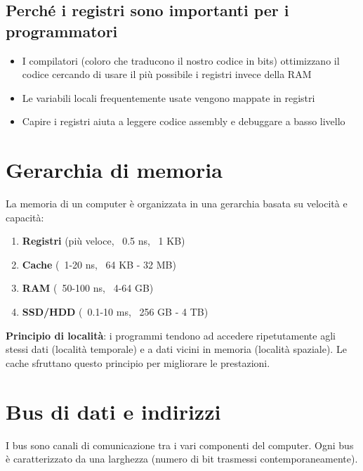 \documentclass[12pt,a4paper]{article}
\begin{document}
\subsection{\texorpdfstring{\colorbox{gray!50}{Perché i registri sono importanti per i programmatori}}{}}
\begin{itemize}
    \item I compilatori (coloro che traducono il nostro codice in bits) ottimizzano il codice cercando di usare il più possibile i registri invece della RAM
    \item Le variabili locali frequentemente usate vengono mappate in registri
    \item Capire i registri aiuta a leggere codice assembly e debuggare a basso livello
\end{itemize}

\section{Gerarchia di memoria}
La memoria di un computer è organizzata in una gerarchia basata su velocità e capacità:

\begin{enumerate}
    \item \textbf{Registri} (più veloce, ~0.5 ns, ~1 KB)
    \item \textbf{Cache} (~1-20 ns, ~64 KB - 32 MB)
    \item \textbf{RAM} (~50-100 ns, ~4-64 GB)
    \item \textbf{SSD/HDD} (~0.1-10 ms, ~256 GB - 4 TB)
\end{enumerate}

\textbf{\texorpdfstring{\colorbox{gray!50}{Principio di località}}{}}: i programmi tendono ad accedere ripetutamente agli stessi dati (località temporale) e a dati vicini in memoria (località spaziale). Le cache sfruttano questo principio per migliorare le prestazioni.

\section{Bus di dati e indirizzi}
I bus sono canali di comunicazione tra i vari componenti del computer. Ogni bus è caratterizzato da una larghezza (numero di bit trasmessi contemporaneamente).
\end{document}
